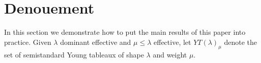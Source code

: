 \documentclass[draft]{article}
\begin{document}
\begin{comment}
\begin{lemma}%
    Let $\mu',\mu''$ be dominant and let $s\in \AA^1 - \{0\}$. Then 
    \begin{equation}
        S_{\mu',\mu''}^s \subset \cW_\mu 
    \end{equation}
    where $\mu = \mu_1 + \mu_2$.
\end{lemma}

\begin{proof}
    We have
\[
\begin{split}
    S_{\mu_1, \mu_2} & = N\xT[t^{-1}]t^{\mu_1}(t-s)^{\mu_2} \\
     & \subset T_1\xt[t^{-1}] N\xT[t^{-1}] t^{\mu_1} (t-s)^{\mu_2} \\
     & = T_1\xt[t^{-1}] N_1\xt[t^{-1}] t^{\mu_1} (t-s)^{\mu_2} \qquad \text{\cite[Lemma 2.3]{kamnitzer2014yangians}}\\
     & = B_1\xt[t^{-1}] t^{\mu_1} (t-s)^{\mu_2} \\
     & = B_1\xt[t^{-1}] t^{\mu_1 + \mu_2} \\
     & \subset G_1\xt[t^{-1}] t^{\mu_1 + \mu_2} \\
     & = W_{\mu_1 + \mu_2}
\end{split}
\]
where $B_1\xt[t^{-1}] t^{\mu_1} (t-s)^{\mu_2} = B_1\xt[t^{-1}] t^{\mu_1 + \mu_2}$ since 
\[
\frac{t}{t-s} = 
1 + \frac{s}{t} + \frac{s^2}{t^2} + \cdots 
\in B_1\xt[t^{-1}].
\]
\end{proof}
\end{comment}

\section{Denouement}
\label{s:denouement}
% 
In this section we demonstrate how to put the main results of this paper into practice.
% 
Given $\lambda$ dominant effective and $\mu\le\lambda$ effective, let $YT(\lambda)_\mu$ denote the set of semistandard Young tableaux of shape $\lambda$ and weight $\mu$. 
% 
\end{document}
